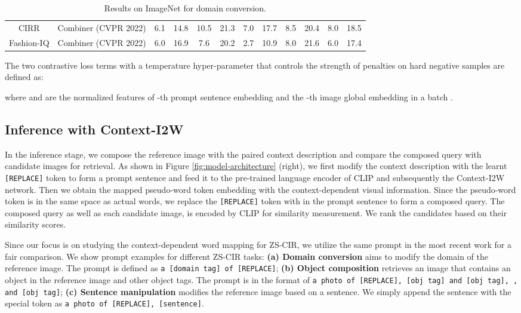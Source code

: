\documentclass[letterpaper]{article} \usepackage{aaai24}  \usepackage{times}  \usepackage{helvet}  \usepackage{courier}  \usepackage[hyphens]{url}  \usepackage{graphicx} \urlstyle{rm} \def\UrlFont{\rm}  \usepackage{natbib}  \usepackage{caption} \frenchspacing  \setlength{\pdfpagewidth}{8.5in} \setlength{\pdfpageheight}{11in} \usepackage{algorithm}
\begin{document}
\begin{table*}[t]
{\begin{tabular}{cccccccccccc}
CIRR                       & Combiner (CVPR 2022)    & 6.1          & \multicolumn{1}{c|}{14.8}          & 10.5          & \multicolumn{1}{c|}{21.3}          & 7.0           & \multicolumn{1}{c|}{17.7}          & 8.5           & \multicolumn{1}{c|}{20.4}          & 8.0           & 18.5          \\
Fashion-IQ                 & Combiner (CVPR 2022)    & 6.0          & \multicolumn{1}{c|}{16.9}          & 7.6           & \multicolumn{1}{c|}{20.2}          & 2.7           & \multicolumn{1}{c|}{10.9}          & 8.0           & \multicolumn{1}{c|}{21.6}          & 6.0           & 17.4          \\ \bottomrule
\end{tabular}}
\caption{Results on ImageNet for domain conversion.}
\label{tab:imgnet}
\end{table*}

The two contrastive loss terms with a temperature hyper-parameter  that controls the strength of penalties on hard negative samples are defined as:




\noindent where  and  are the normalized features of -th prompt sentence embedding  and the -th image global embedding  in a batch . 



\subsection{Inference with Context-I2W}
\label{sec:inference}


In the inference stage, we compose the reference image with the paired context description and compare the composed query with candidate images for retrieval. As shown in Figure \ref{fig:model-architecture} (right), we first modify the context description with the learnt  \texttt{[REPLACE]} token to form a prompt sentence and feed it to the pre-trained language encoder of CLIP and subsequently the Context-I2W network. Then we obtain the mapped pseudo-word token embedding  with the context-dependent visual information. Since the pseudo-word token is in the same space as actual words, we replace the \texttt{[REPLACE]} token with  in the prompt sentence to form a composed query. The composed query as well as each candidate image, is encoded by CLIP for similarity measurement. We rank the candidates based on their similarity scores. 

Since our focus is on studying the context-dependent word mapping for ZS-CIR, we utilize the same prompt in the most recent work \cite{Saito_2023_CVPR} for a fair comparison. We show prompt examples for different ZS-CIR tasks: \textbf{(a) Domain conversion} aims to modify the domain of the reference image. 
The  prompt is defined as \texttt{a [domain tag] of [REPLACE]}; 
\textbf{(b) Object composition} retrieves an image that contains an object in the reference image and other object tags. The prompt is in the format of \texttt{a photo of [REPLACE], [obj tag] and [obj tag], , and [obj tag]}; 
\textbf{(c) Sentence manipulation} modifies the reference image based on a sentence. We simply append the sentence with the special token as  \texttt{a photo of [REPLACE], [sentence]}.
\end{document}

